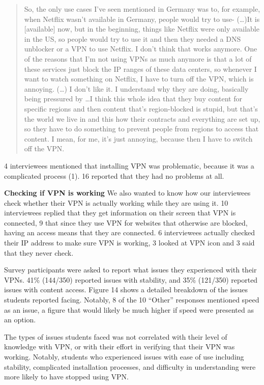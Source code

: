 \begin{quote}So, the only use cases I've seen mentioned in Germany was to, for example, when Netflix wasn't available in Germany, people would try to use-
(\dots)It is [available] now, but in the beginning, things like Netflix were only available in the US, so people would try to use it and then they needed a DNS unblocker or a VPN to use Netflix. I don't think that works anymore. One of the reasons that I'm not using VPNs as much anymore is that a lot of these services just block the IP ranges of these data centers, so whenever I want to watch something on Netflix, I have to turn off the VPN, which is annoying. (\dots) I don't like it. I understand why they are doing, basically being pressured by \dots I think this whole idea that they buy content for specific regions and then content that's region-blocked is stupid, but that's the world we live in and this how their contracts and everything are set up, so they have to do something to prevent people from regions to access that content. I mean, for me, it's just annoying, because then I have to switch off the VPN. \end{quote}


4 interviewees mentioned that installing VPN was problematic, because it was a complicated process (1). 16 reported that they had no problems at all. 

\textbf{Checking if VPN is working}
We also wanted to know how our interviewees check whether their VPN is actually working while they are using it. 10 interviewees replied that they get information on their screen that VPN is connected, 9 that since they use VPN for websites that otherwise are blocked, having an access means that they are connected. 6 interviewees actually checked their IP address to make sure VPN is working, 3 looked at VPN icon and 3 said that they never check. 

Survey participants were asked to report what issues they experienced with their VPNs. 41\% (144/350) reported issues with stability, and 35\% (121/350) reported issues with content access. Figure 14 shows a detailed breakdown of the issues students reported facing. Notably, 8 of the 10 “Other” responses mentioned speed as an issue, a figure that would likely be much higher if speed were presented as an option.

The types of issues students faced was not correlated with their level of knowledge with VPN, or with their effort in verifying that their VPN was working. Notably, students who experienced issues with ease of use including stability, complicated installation processes, and difficulty in understanding were more likely to have stopped using VPN.

